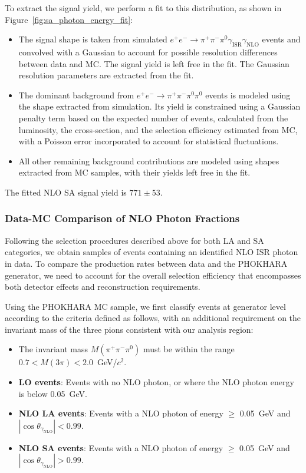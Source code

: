 To extract the signal yield, we perform a fit to this distribution, as shown in Figure~\ref{fig:sa_photon_energy_fit}:
\begin{itemize}
    \item The signal shape is taken from simulated \(e^+e^- \to \pi^+\pi^-\pi^0\gamma_{\text{ISR}}\gamma_{\text{NLO}}\) events and convolved with a Gaussian to account for possible resolution differences between data and MC. The signal yield is left free in the fit. The Gaussian resolution parameters are extracted from the fit.
    \item The dominant background from \(e^+e^- \to \pi^+\pi^-\pi^0\pi^0\) events is modeled using the shape extracted from simulation. Its yield is constrained using a Gaussian penalty term based on the expected number of events, calculated from the luminosity, the cross-section, and the selection efficiency estimated from MC, with a Poisson error incorporated to account for statistical fluctuations.
    \item All other remaining background contributions are modeled using shapes extracted from MC samples, with their yields left free in the fit.
\end{itemize}

The fitted NLO SA signal yield is $771 \pm 53$.

\subsubsection{Data-MC Comparison of NLO Photon Fractions}

Following the selection procedures described above for both LA and SA categories, we obtain samples of events containing an identified NLO ISR photon in data. To compare the production rates between data and the PHOKHARA generator, we need to account for the overall selection efficiency that encompasses both detector effects and reconstruction requirements.

Using the PHOKHARA MC sample, we first classify events at generator level according to the criteria defined as follows, with an additional requirement on the invariant mass of the three pions consistent with our analysis region:
\begin{itemize}
    \item The invariant mass $M(\pi^+\pi^-\pi^0)$ must be within the range $0.7 < M(3\pi) < 2.0$~GeV/$c^2$.
    \item \textbf{LO events}: Events with no NLO photon, or where the NLO photon energy is below 0.05~GeV.
    \item \textbf{NLO LA events}: Events with a NLO photon of energy $\ge$ 0.05~GeV and $|\cos\theta_{\gamma_{\text{NLO}}}| < 0.99$.
    \item \textbf{NLO SA events}: Events with a NLO photon of energy $\ge$ 0.05~GeV and $|\cos\theta_{\gamma_{\text{NLO}}}| > 0.99$.
\end{itemize}

